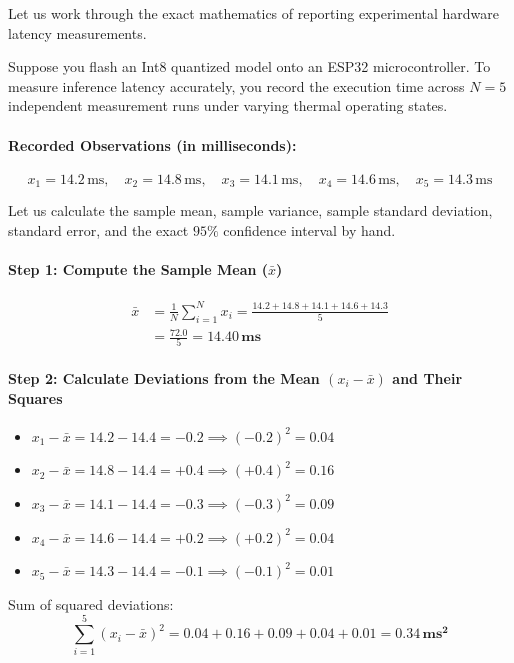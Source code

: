 Let us work through the exact mathematics of reporting experimental hardware latency measurements.

\begin{example}
Suppose you flash an Int8 quantized model onto an ESP32 microcontroller. To measure inference latency accurately, you record the execution time across $N = 5$ independent measurement runs under varying thermal operating states.

\paragraph{Recorded Observations (in milliseconds):}
\begin{equation*}
x_1 = 14.2\,\text{ms}, \quad x_2 = 14.8\,\text{ms}, \quad x_3 = 14.1\,\text{ms}, \quad x_4 = 14.6\,\text{ms}, \quad x_5 = 14.3\,\text{ms}
\end{equation*}

Let us calculate the sample mean, sample variance, sample standard deviation, standard error, and the exact $95\%$ confidence interval by hand.

\paragraph{Step 1: Compute the Sample Mean ($\bar{x}$)}
\begin{align*}
\bar{x} &= \frac{1}{N} \sum_{i=1}^{N} x_i = \frac{14.2 + 14.8 + 14.1 + 14.6 + 14.3}{5} \\
&= \frac{72.0}{5} = \mathbf{14.40\,\text{ms}}
\end{align*}

\paragraph{Step 2: Calculate Deviations from the Mean $(x_i - \bar{x})$ and Their Squares}
\begin{itemize}
    \item $x_1 - \bar{x} = 14.2 - 14.4 = -0.2 \implies (-0.2)^2 = \mathbf{0.04}$
    \item $x_2 - \bar{x} = 14.8 - 14.4 = +0.4 \implies (+0.4)^2 = \mathbf{0.16}$
    \item $x_3 - \bar{x} = 14.1 - 14.4 = -0.3 \implies (-0.3)^2 = \mathbf{0.09}$
    \item $x_4 - \bar{x} = 14.6 - 14.4 = +0.2 \implies (+0.2)^2 = \mathbf{0.04}$
    \item $x_5 - \bar{x} = 14.3 - 14.4 = -0.1 \implies (-0.1)^2 = \mathbf{0.01}$
\end{itemize}
Sum of squared deviations:
\begin{equation*}
\sum_{i=1}^{5} (x_i - \bar{x})^2 = 0.04 + 0.16 + 0.09 + 0.04 + 0.01 = \mathbf{0.34\,\text{ms}^2}
\end{equation*}


\end{example}
